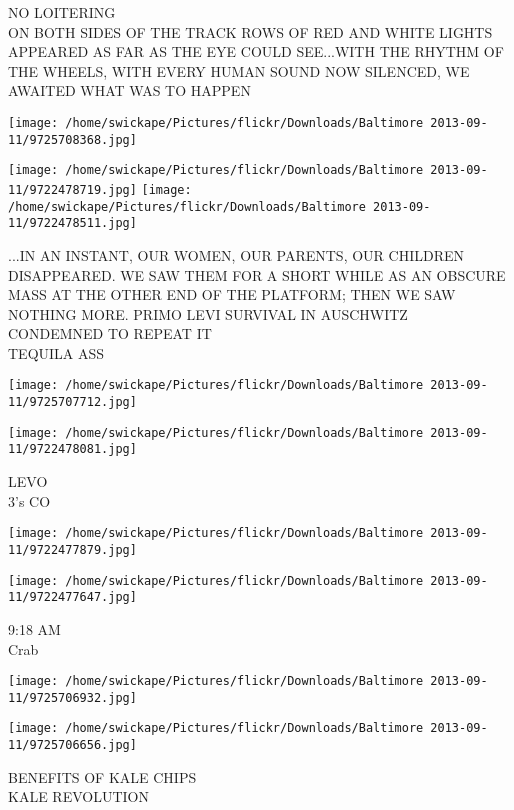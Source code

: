 \documentclass[10pt,letterpaper]{article}
\begin{document}
NO LOITERING\\
ON BOTH SIDES OF THE TRACK ROWS OF RED AND WHITE LIGHTS APPEARED AS FAR AS THE EYE COULD SEE...WITH THE RHYTHM OF THE WHEELS, WITH EVERY HUMAN SOUND NOW SILENCED, WE AWAITED WHAT WAS TO HAPPEN
\pagebreak

\texttt{[image: /home/swickape/Pictures/flickr/Downloads/Baltimore 2013-09-11/9725708368.jpg]}

\vspace{0.25in}
\texttt{[image: /home/swickape/Pictures/flickr/Downloads/Baltimore 2013-09-11/9722478719.jpg]}
\texttt{[image: /home/swickape/Pictures/flickr/Downloads/Baltimore 2013-09-11/9722478511.jpg]}

...IN AN INSTANT, OUR WOMEN, OUR PARENTS, OUR CHILDREN DISAPPEARED.  WE SAW THEM FOR A SHORT WHILE AS AN OBSCURE MASS AT THE OTHER END OF THE PLATFORM; THEN WE SAW NOTHING MORE.  PRIMO LEVI  SURVIVAL IN AUSCHWITZ\\
CONDEMNED TO REPEAT IT\\
TEQUILA ASS
\pagebreak

\texttt{[image: /home/swickape/Pictures/flickr/Downloads/Baltimore 2013-09-11/9725707712.jpg]}

\vspace{0.25in}
\texttt{[image: /home/swickape/Pictures/flickr/Downloads/Baltimore 2013-09-11/9722478081.jpg]}

LEVO\\
3's CO
\pagebreak

\texttt{[image: /home/swickape/Pictures/flickr/Downloads/Baltimore 2013-09-11/9722477879.jpg]}

\vspace{0.25in}
\texttt{[image: /home/swickape/Pictures/flickr/Downloads/Baltimore 2013-09-11/9722477647.jpg]}

9:18 AM\\
Crab
\pagebreak

\texttt{[image: /home/swickape/Pictures/flickr/Downloads/Baltimore 2013-09-11/9725706932.jpg]}

\vspace{0.25in}
\texttt{[image: /home/swickape/Pictures/flickr/Downloads/Baltimore 2013-09-11/9725706656.jpg]}

BENEFITS OF KALE CHIPS\\
KALE REVOLUTION
\pagebreak
\end{document}
